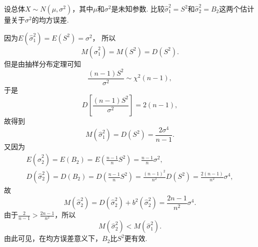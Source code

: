 \begin{example}
设总体\(X \sim N(\mu,\sigma^2)\)，其中\(\mu\)和\(\sigma^2\)是未知参数.
比较\(\hat\sigma_1^2=S^2\)和\(\hat\sigma_2^2=B_2\)这两个估计量关于\(\sigma^2\)的均方误差.
\begin{solution}
因为\(E(\hat{\sigma}_1^2)
= E(S^2)
= \sigma^2\)，
所以\begin{equation*}
	M(\hat{\sigma}_1^2)
	= M(S^2)
	= D(S^2).
\end{equation*}
但是由抽样分布定理可知\begin{equation*}
	\frac{(n-1) S^2}{\sigma^2}
	\sim
	\chi^2(n-1),
\end{equation*}
于是\begin{equation*}
	D\left[\frac{(n-1) S^2}{\sigma^2}\right]
	= 2(n-1),
\end{equation*}
故得到\begin{equation*}
	M(\hat{\sigma}_1^2)
	= D(S^2)
	= \frac{2\sigma^4}{n-1}.
\end{equation*}
又因为\begin{gather*}
	E(\hat{\sigma}_2^2)
	= E(B_2)
	= E\left(\frac{n-1}{n} S^2\right)
	= \frac{n-1}{n} \sigma^2, \\
	D(\hat{\sigma}_2^2)
	= D(B_2)
	= D\left(\frac{n-1}{n} S^2\right)
	= \frac{(n-1)^2}{n^2} D(S^2)
	= \frac{2(n-1)}{n^2} \sigma^4,
\end{gather*}
故\begin{equation*}
	M(\hat{\sigma}_2^2)
	= D(\hat{\sigma}_2^2) + b^2(\hat{\sigma}_2^2)
	= \frac{2n-1}{n^2} \sigma^4.
\end{equation*}
由于\(\frac{2}{n-1} > \frac{2n-1}{n^2}\)，所以\begin{equation*}
	M(\hat{\sigma}_2^2) < M(\hat{\sigma}_1^2).
\end{equation*}
由此可见，在均方误差意义下，\(B_2\)比\(S^2\)更有效.
\end{solution}
\end{example}

